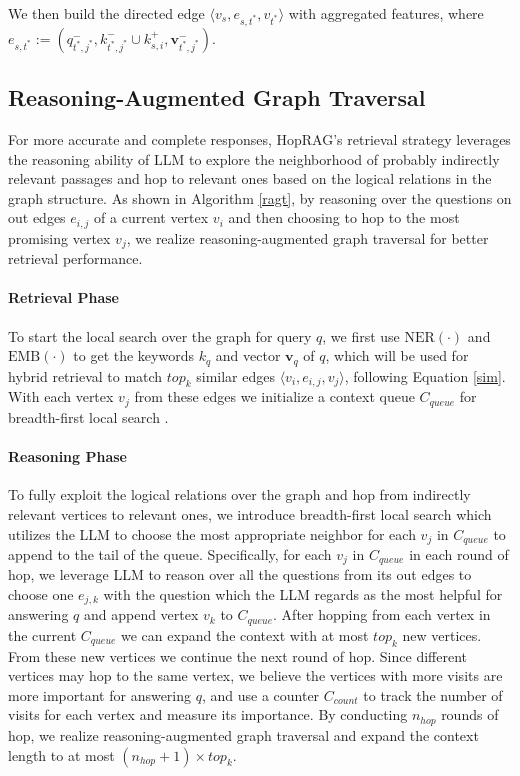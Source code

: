 We then build the directed edge $\langle v_s,e_{s,t^*},v_{t^*} \rangle$ with aggregated features, where $e_{s,t^*}:=({q_{t^*,j^*}^{-}},{k_{t^*,j^*}^{-}\cup k_{s,i}^{+}},{\mathbf{v}_{t^*,j^*}^{-}})$. 

\subsection{Reasoning-Augmented Graph Traversal }
For more accurate and complete responses, HopRAG's retrieval strategy leverages the reasoning ability of LLM to explore the neighborhood of probably indirectly relevant passages and hop to relevant ones based on the logical relations in the graph structure. As shown in Algorithm \ref{ragt}, by reasoning over the questions on out edges $e_{i,j}$ of a current vertex $v_{i}$ and then choosing to hop to the most promising vertex $v_{j}$, we realize reasoning-augmented graph traversal for better retrieval performance. 

\paragraph{Retrieval Phase} To start the local search over the graph for query $q$, we first use $\text{NER}(\cdot)$ and $\text{EMB}(\cdot)$ to get the keywords $ k_{q}$ and vector $\mathbf{v}_{q}$ of $q$, which will be used for hybrid retrieval to match $top_k$ similar edges $\langle v_i,e_{i,j},v_j \rangle $, following Equation \ref{sim}. With each vertex $v_j$ from these edges we initialize a context queue $C_{queue}$ for breadth-first local search \citep{voudouris2010guided}. 

\paragraph{Reasoning Phase} To fully exploit the logical relations over the graph and hop from indirectly relevant vertices to relevant ones, we introduce breadth-first local search which utilizes the LLM to choose the most appropriate neighbor for each $v_j$ in $C_{queue}$ to append to the tail of the queue. Specifically, for each $v_j$ in $C_{queue}$ in each round of hop, we leverage LLM to reason over all the questions from its out edges to choose one $e_{j,k}$ with the question which the LLM regards as the most helpful for answering $q$ and append vertex $v_k$ to $C_{queue}$.  
After hopping from each vertex in the current $C_{queue}$ we can expand the context with at most $top_k$ new vertices. From these new vertices we continue the next round of hop. Since different vertices may hop to the same vertex, we believe the vertices with more visits are more important for answering $q$, and use a counter $C_{count}$ to track the number of visits for each vertex and measure its importance. By conducting $n_{hop}$ rounds of hop, we realize reasoning-augmented graph traversal and expand the context length to at most $(n_{hop}+1)\times top_k$.

